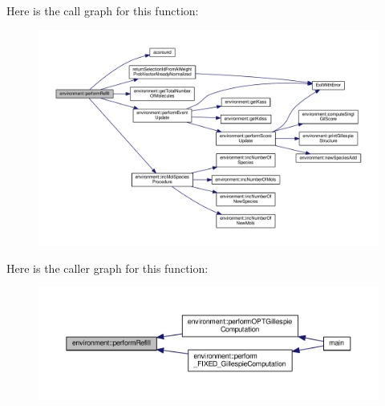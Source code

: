 Here is the call graph for this function\-:\nopagebreak
\begin{figure}[H]
\begin{center}
\leavevmode
\includegraphics[width=350pt]{a00011_a8a53821ad1675b0da50591616aac3b74_cgraph}
\end{center}
\end{figure}




Here is the caller graph for this function\-:\nopagebreak
\begin{figure}[H]
\begin{center}
\leavevmode
\includegraphics[width=350pt]{a00011_a8a53821ad1675b0da50591616aac3b74_icgraph}
\end{center}
\end{figure}


